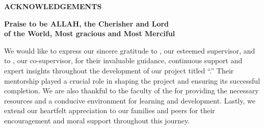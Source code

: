 \begin{center}
{\Large\bfseries ACKNOWLEDGEMENTS\par}
\vspace{0.4cm}
{\bfseries Praise to be ALLAH, the Cherisher and Lord\\ of the World, Most gracious and Most Merciful\par}
\end{center}
\vspace{0.2cm}
{
We would like to express our sincere gratitude to \supervisor, our esteemed supervisor, and to \cosupervisor, our co-supervisor, for their invaluable guidance, continuous support and expert insights throughout the development of our project titled ``\projecttitleinline.'' Their mentorship played a crucial role in shaping the project and ensuring its successful completion. We are also thankful to the faculty of the \department{} for providing the necessary resources and a conducive environment for learning and development. Lastly, we extend our heartfelt appreciation to our families and peers for their encouragement and moral support throughout this journey.\par}
\vspace{1.5cm}
\begin{flushright}
\studentA\\
\studentB
\end{flushright}
\clearpage

